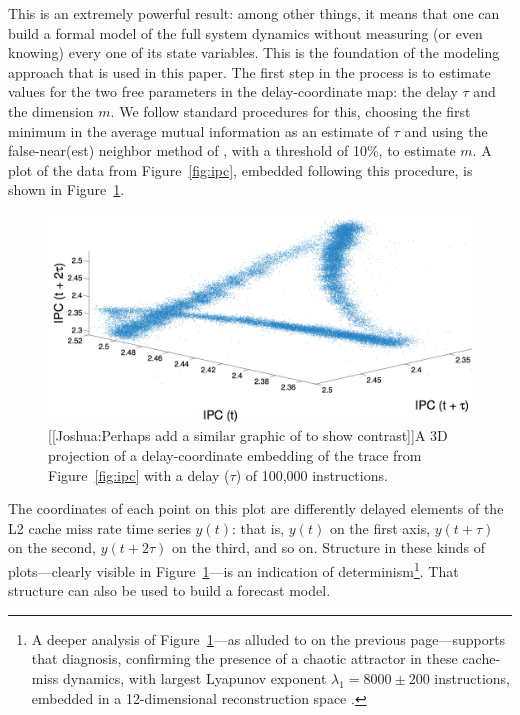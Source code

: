 This is an extremely powerful result: among other things, it means
that one can build a formal model of the full system dynamics without
measuring (or even knowing) every one of its state variables.  This is
the foundation of the modeling approach that is used in this paper.
The first step in the process is to estimate values for the two free
parameters in the delay-coordinate map: the delay $\tau$ and the
dimension $m$.  We follow standard procedures for this, choosing the
first minimum in the average mutual information as an estimate of
$\tau$ \cite{fraser-swinney} and using the false-near(est) neighbor
method of \cite{KBA92}, with a threshold of 10\%, to estimate $m$.  A
plot of the data from Figure~\ref{fig:ipc}, embedded following this
procedure, is shown in Figure~\ref{fig:embedding}.


 \begin{figure}
   \centering
     \includegraphics[width=\textwidth]{figs/colipc3d.png}
     \caption{[[Joshua:Perhaps add a similar graphic of \gcc to show contrast]]A 3D projection of a delay-coordinate embedding of the trace
 from Figure~\ref{fig:ipc} with a delay ($\tau$) of 100,000 instructions.
 }
 \label{fig:embedding}
 \end{figure}


The coordinates of each point on this plot are differently delayed
elements of the \col L2 cache miss rate time series
$y(t)$: that is, $y(t)$ on the first axis, $y(t+\tau)$ on the second,
$y(t+2\tau)$ on the third, and so on.
Structure in these kinds of plots---clearly visible in
Figure~\ref{fig:embedding}---is an indication of
determinism\footnote{A deeper analysis of
  Figure~\ref{fig:embedding}---as alluded to on the previous
  page---supports that diagnosis, confirming the presence of a chaotic
  attractor in these cache-miss dynamics, with largest Lyapunov
  exponent $\lambda_1 = 8000 \pm 200$ instructions, embedded in a
  12-dimensional reconstruction space \cite{mytkowicz09}.}.  That
structure can also be used to build a forecast model.

